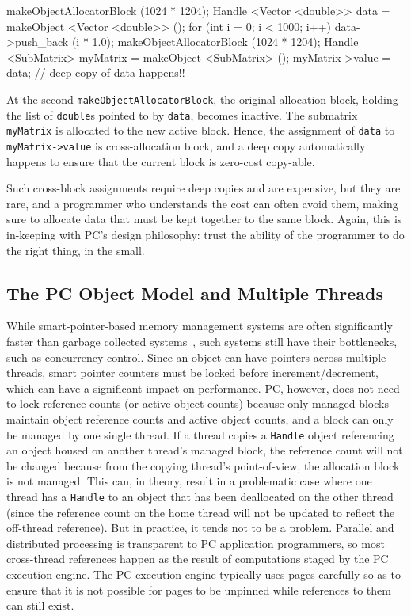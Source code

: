 \begin{codesmall}
makeObjectAllocatorBlock (1024 * 1204);
Handle <Vector <double>> data = 
     makeObject <Vector <double>> ();
for (int i = 0; i < 1000; i++)
     data->push_back (i * 1.0);
makeObjectAllocatorBlock (1024 * 1204); 
Handle <SubMatrix> myMatrix = 
     makeObject <SubMatrix> ();
myMatrix->value = data; // deep copy of data happens!!
\end{codesmall}

At the second \texttt{makeObjectAllocatorBlock}, the original allocation block, holding the list of \texttt{double}s pointed to by \texttt{data}, becomes
inactive.  The submatrix \texttt{myMatrix} is allocated to the new active block.  
Hence, the assignment of \texttt{data} to \texttt{myMatrix->value} is cross-allocation block, and a deep copy automatically happens to ensure that
the current block is zero-cost copy-able.  

Such cross-block assignments require deep copies and are
expensive, but they are rare, and a programmer who understands the cost can often avoid them, making sure to allocate
data that must be kept together to the same block.
Again, this is in-keeping with PC's design philosophy: trust the ability of the programmer to do the right thing, in the small.

\subsection{The PC Object Model and Multiple Threads}

While smart-pointer-based memory management
systems are often significantly faster than garbage collected
systems~\cite{hertz2005quantifying}, such systems still have their
bottlenecks, such as concurrency
control.
Since an object can have pointers across multiple threads, smart pointer counters must be locked before increment/decrement, which
can have a significant impact on performance.  PC, however, does not need to lock reference counts (or active object counts) because only managed blocks maintain
object reference counts and active object counts,
and a block can only be managed by one single thread.  
If a thread copies a \texttt{Handle} object referencing an object housed on another thread's managed block, 
the reference count will not be changed because from the copying thread's point-of-view, the allocation block is not managed.
This can, in theory, result in a problematic case where one thread has a \texttt{Handle} to an object that has been deallocated on the other thread (since
the reference count on the home thread will not be updated to reflect
the off-thread reference).  But in practice, it tends not to be a
problem.  Parallel and distributed processing is transparent to PC application
programmers, so most cross-thread references happen as the result of computations staged by the 
PC execution engine.  The PC execution engine typically uses pages carefully so as to ensure that 
it is not possible for pages to be unpinned while references to them can still exist.

